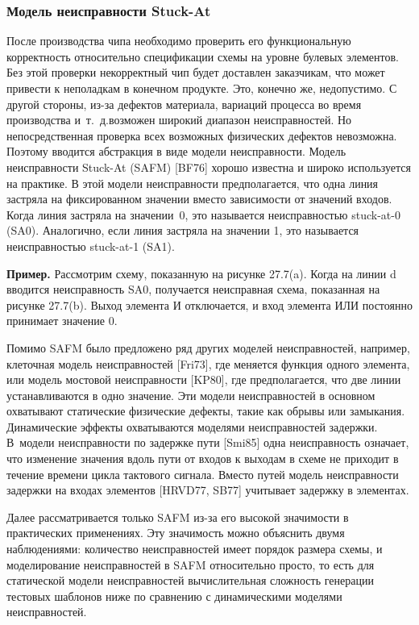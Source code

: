 \subsubsection{Модель неисправности Stuck-At}

После производства чипа необходимо проверить его функциональную корректность относительно спецификации схемы на уровне булевых элементов.
Без этой проверки некорректный чип будет доставлен заказчикам, что может привести к неполадкам в конечном продукте. Это, конечно же, недопустимо.
С другой стороны, из-за дефектов материала, вариаций процесса во время производства и~т.\@~д.\@ возможен широкий диапазон неисправностей.
Но непосредственная проверка всех возможных физических дефектов невозможна.
Поэтому вводится абстракция в виде модели неисправности.
Модель неисправности Stuck-At (SAFM) [BF76] хорошо известна и широко используется на практике.
В этой модели неисправности предполагается, что одна линия застряла на фиксированном значении вместо зависимости от значений входов.
Когда линия застряла на значении~0, это называется неисправностью stuck-at-0 (SA0).
Аналогично, если линия застряла на значении 1, это называется неисправностью stuck-at-1 (SA1).

\textbf{Пример.}
Рассмотрим схему, показанную на рисунке 27.7(a). Когда на линии d вводится неисправность SA0, получается неисправная схема, показанная на рисунке 27.7(b). Выход элемента И отключается, и вход элемента ИЛИ постоянно принимает значение 0.

Помимо SAFM было предложено ряд других моделей неисправностей, например, клеточная модель неисправностей [Fri73], где меняется функция одного элемента, или модель мостовой неисправности [KP80], где предполагается, что две линии устанавливаются в одно значение.
Эти модели неисправностей в основном охватывают статические физические дефекты, такие как обрывы или замыкания.
Динамические эффекты охватываются моделями неисправностей задержки.
В~модели неисправности по задержке пути [Smi85] одна неисправность означает, что изменение значения вдоль пути от входов к выходам в схеме не приходит в течение времени цикла тактового сигнала.
Вместо путей модель неисправности задержки на входах элементов [HRVD77, SB77] учитывает задержку в элементах.

Далее рассматривается только SAFM из-за его высокой значимости в практических применениях.
Эту значимость можно объяснить двумя наблюдениями: количество неисправностей имеет порядок размера схемы, и моделирование неисправностей в SAFM относительно просто, то есть для статической модели неисправностей вычислительная сложность генерации тестовых шаблонов ниже по сравнению с динамическими моделями неисправностей.


